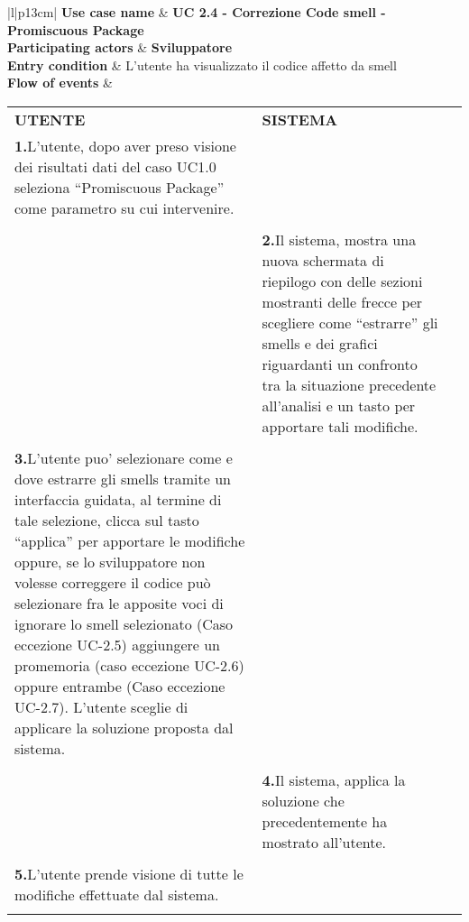 		\begin{tabular}{|l|p{13cm}|}
			\hline
			\textbf{Use case name}  & \textbf{UC 2.4 - Correzione Code smell - Promiscuous Package} \\ \hline
			\textbf{Participating actors}  & \textbf{Sviluppatore} \\ \hline
			\textbf{Entry condition}  & L’utente ha visualizzato il codice affetto da smell  \\  \hline
			\textbf{Flow of events}  &  
			\begin{tabular}{p{6cm}p{6cm}p{6cm}}
				\centering \textbf{UTENTE} & \centering \textbf{SISTEMA} & \\
				\textbf{1.}\hspace{0.3cm}L’utente, dopo aver preso visione dei risultati dati del caso UC1.0 seleziona “Promiscuous Package” come parametro su cui intervenire.
				\\ \\ &
				\textbf{2.}\hspace{0.3cm}Il sistema, mostra una nuova schermata di riepilogo con delle sezioni mostranti delle frecce per scegliere come “estrarre” gli smells e dei grafici riguardanti un confronto tra la situazione precedente all’analisi e un tasto per apportare tali modifiche. \\ \\
				
				\textbf{3.}\hspace{0.3cm}L'utente puo' selezionare come e dove estrarre gli smells tramite un interfaccia guidata, al termine di tale selezione, clicca sul tasto “applica” per apportare le modifiche oppure, se lo sviluppatore non volesse correggere il codice può selezionare fra le apposite voci di ignorare lo smell selezionato (Caso eccezione UC-2.5) aggiungere un promemoria (caso eccezione UC-2.6) oppure entrambe (Caso eccezione   UC-2.7). L'utente sceglie di applicare la soluzione proposta dal sistema.
				\\ \\ & 
				\textbf{4.}\hspace{0.3cm}Il sistema, applica la soluzione che precedentemente ha mostrato all'utente. \\ \\
				
				\textbf{5.}\hspace{0.3cm}L'utente prende visione di tutte le modifiche effettuate dal sistema. \\ \\
				

\end{tabular}
\end{tabular}
